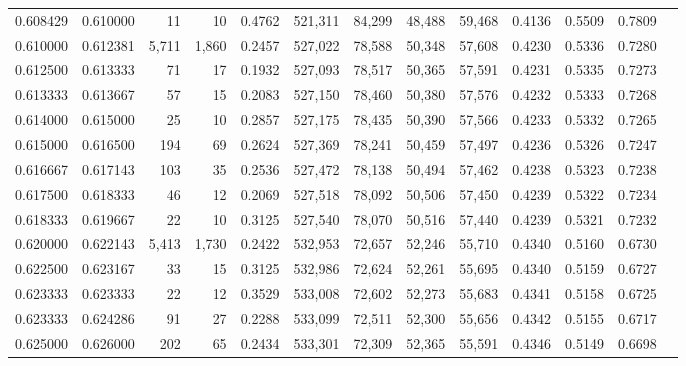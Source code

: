 \begin{tabular}{rrrrrrrrrrrrr}
0.608429 & 0.610000 &     11 &    10 &                                     0.4762 & 521,311 &  84,299 &  48,488 &  59,468 & 0.4136 & 0.5509 & 0.7809 \\
0.610000 & 0.612381 &  5,711 & 1,860 &                                     0.2457 & 527,022 &  78,588 &  50,348 &  57,608 & 0.4230 & 0.5336 & 0.7280 \\
0.612500 & 0.613333 &     71 &    17 &                                     0.1932 & 527,093 &  78,517 &  50,365 &  57,591 & 0.4231 & 0.5335 & 0.7273 \\
0.613333 & 0.613667 &     57 &    15 &                                     0.2083 & 527,150 &  78,460 &  50,380 &  57,576 & 0.4232 & 0.5333 & 0.7268 \\
0.614000 & 0.615000 &     25 &    10 &                                     0.2857 & 527,175 &  78,435 &  50,390 &  57,566 & 0.4233 & 0.5332 & 0.7265 \\
0.615000 & 0.616500 &    194 &    69 &                                     0.2624 & 527,369 &  78,241 &  50,459 &  57,497 & 0.4236 & 0.5326 & 0.7247 \\
0.616667 & 0.617143 &    103 &    35 &                                     0.2536 & 527,472 &  78,138 &  50,494 &  57,462 & 0.4238 & 0.5323 & 0.7238 \\
0.617500 & 0.618333 &     46 &    12 &                                     0.2069 & 527,518 &  78,092 &  50,506 &  57,450 & 0.4239 & 0.5322 & 0.7234 \\
0.618333 & 0.619667 &     22 &    10 &                                     0.3125 & 527,540 &  78,070 &  50,516 &  57,440 & 0.4239 & 0.5321 & 0.7232 \\
0.620000 & 0.622143 &  5,413 & 1,730 &                                     0.2422 & 532,953 &  72,657 &  52,246 &  55,710 & 0.4340 & 0.5160 & 0.6730 \\
0.622500 & 0.623167 &     33 &    15 &                                     0.3125 & 532,986 &  72,624 &  52,261 &  55,695 & 0.4340 & 0.5159 & 0.6727 \\
0.623333 & 0.623333 &     22 &    12 &                                     0.3529 & 533,008 &  72,602 &  52,273 &  55,683 & 0.4341 & 0.5158 & 0.6725 \\
0.623333 & 0.624286 &     91 &    27 &                                     0.2288 & 533,099 &  72,511 &  52,300 &  55,656 & 0.4342 & 0.5155 & 0.6717 \\
0.625000 & 0.626000 &    202 &    65 &                                     0.2434 & 533,301 &  72,309 &  52,365 &  55,591 & 0.4346 & 0.5149 & 0.6698 \\

\end{tabular}

